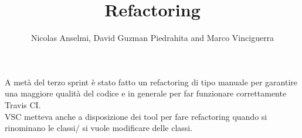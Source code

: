 \documentclass{article}
\title{Refactoring}
\author{Nicolas Anselmi, David Guzman Piedrahita and Marco Vinciguerra}
\begin{document}
\maketitle
A metà del terzo sprint è stato fatto un refactoring di tipo manuale per garantire 
una maggiore qualità del codice e in generale per far funzionare correttamente Travis CI.
\\VSC metteva anche a disposizione dei tool per fare refactoring quando si rinominano le classi/ si vuole modificare delle classi.
\end{document}
